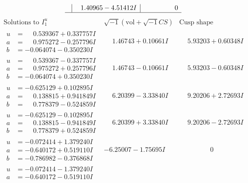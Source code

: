 \documentclass[1p]{elsarticle_modified}
\theoremstyle{definition}
\newcommand{\I}{\sqrt{-1}}
\begin{document}
$$\begin{array}{c|c|c}
 & \phantom{-}1.40965 - 4.51412 I & \phantom{-0.000000 } 0\\
 \hline 
 \end{array}$$\newpage$$\begin{array}{c|c|c}  
\text{Solutions to }I^u_{1}& \I (\text{vol} + \sqrt{-1}CS) & \text{Cusp shape}\\
 \hline 
\begin{aligned}
u &= \phantom{-}0.539367 + 0.337757 I \\
a &= \phantom{-}0.975272 - 0.257796 I \\
b &= -0.064074 - 0.350230 I\end{aligned}
 & \phantom{-}1.46743 + 0.10661 I & \phantom{-}5.93203 + 0.60348 I \\ \hline\begin{aligned}
u &= \phantom{-}0.539367 - 0.337757 I \\
a &= \phantom{-}0.975272 + 0.257796 I \\
b &= -0.064074 + 0.350230 I\end{aligned}
 & \phantom{-}1.46743 - 0.10661 I & \phantom{-}5.93203 - 0.60348 I \\ \hline\begin{aligned}
u &= -0.625129 + 0.102895 I \\
a &= \phantom{-}0.138815 + 0.941849 I \\
b &= \phantom{-}0.778379 - 0.524859 I\end{aligned}
 & \phantom{-}6.20399 - 3.33840 I & \phantom{-}9.20206 + 2.72693 I \\ \hline\begin{aligned}
u &= -0.625129 - 0.102895 I \\
a &= \phantom{-}0.138815 - 0.941849 I \\
b &= \phantom{-}0.778379 + 0.524859 I\end{aligned}
 & \phantom{-}6.20399 + 3.33840 I & \phantom{-}9.20206 - 2.72693 I \\ \hline\begin{aligned}
u &= -0.072414 + 1.379240 I \\
a &= -0.640172 + 0.519110 I \\
b &= -0.786982 - 0.376868 I\end{aligned}
 & -6.25007 - 1.75695 I & \phantom{-0.000000 } 0 \\ \hline\begin{aligned}
u &= -0.072414 - 1.379240 I \\
a &= -0.640172 - 0.519110 I \\

\end{aligned}
\end{array}$$
\end{document}
